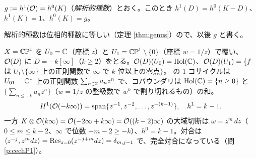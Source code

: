 \begin{cor}\label{cor:serrecor}
$g:=h^1(\mathcal O)=h^0(K)$（\emph{解析的種数}）とおく。このとき $h^1(D)=h^0(K-D)$、$h^1(K)=1$、$h^0(K)=g$。
\end{cor}
解析的種数は位相的種数に等しい（定理 \ref{thm:genus}）ので、以後 $g$ と書く。

\begin{ex}\label{ex:cechP1}
$X=\mathbb{CP}^1$ を $U_0=\mathbb C$（座標 $z$）と $U_1=\mathbb{CP}^1\setminus\{0\}$（座標 $w=1/z$）で覆い、$\mathcal O(D)$ に $D=-k[\infty]$（$k\ge2$）をとる。$\mathcal O(D)(U_0)=\mathrm{Hol}(\mathbb C)$、$\mathcal O(D)(U_1)=\{f$ は $U_1\setminus\{\infty\}$ 上の正則関数で $\infty$ で $k$ 位以上の零点$\}$。\Cech{} の $1$ コサイクルは $U_{01}=\mathbb C^*$ 上の正則関数 $\sum_{n\in\mathbb Z}a_nz^n$ で、コバウンダリは $\mathrm{Hol}(\mathbb C)=\{n\ge0\}$ と $\{\sum_{n\le-k}a_nz^n\}$（$w=1/z$ の整級数で $w^k$ で割り切れるもの）の和。
\[
H^1(\mathcal O(-k\infty))=\mathrm{span}\{z^{-1},z^{-2},\dots,z^{-(k-1)}\},\quad h^1=k-1.
\]
一方 $K\otimes\mathcal O(k\infty)=\mathcal O(-2\infty+k\infty)=\mathcal O((k-2)\infty)$ の大域切断は $\omega=z^m\,dz$（$0\le m\le k-2$、$\infty$ で位数 $-m-2\ge-k$）、$h^0=k-1$。対合は $\langle z^{-j},z^mdz\rangle=\operatorname{Res}_{z=0}(z^{-j+m}dz)=\delta_{m,j-1}$ で、完全対合になっている（問 \ref{p:cechP1}）。
\end{ex}

